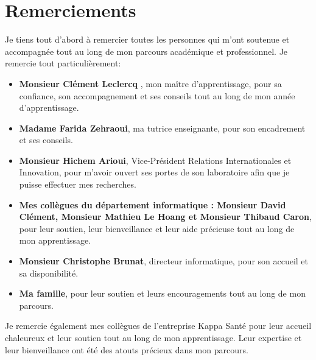 \section{Remerciements}
Je tiens tout d'abord à remercier toutes les personnes qui m'ont soutenue et accompagnée tout au long de mon parcours académique et professionnel. 
Je remercie tout particulièrement: \
\begin{itemize}
    \item \textbf{Monsieur Clément Leclercq }, mon maître d'apprentissage, pour sa confiance, son accompagnement et ses conseils tout au long de mon année d'apprentissage.
    \item \textbf{Madame Farida Zehraoui}, ma tutrice enseignante, pour son encadrement et ses conseils.
    \item \textbf{Monsieur Hichem Arioui}, Vice-Président Relations Internationales et Innovation, pour m'avoir ouvert ses portes de son laboratoire afin que je puisse effectuer mes recherches.
    \item \textbf{Mes collègues du département informatique : Monsieur David Clément, Monsieur Mathieu Le Hoang et Monsieur Thibaud Caron}, pour leur soutien, leur bienveillance et leur aide précieuse tout au long de mon apprentissage.
    \item \textbf{Monsieur Christophe Brunat}, directeur informatique, pour son accueil et sa disponibilité.
    \item \textbf{Ma famille}, pour leur soutien et leurs encouragements tout au long de mon parcours.
\end{itemize}
Je remercie également mes collègues de l'entreprise Kappa Santé pour leur accueil chaleureux et leur soutien tout au long de mon apprentissage. Leur expertise et leur bienveillance ont été des atouts précieux dans mon parcours.